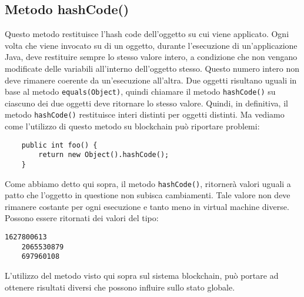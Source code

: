 		\subsection{Metodo hashCode()}
		\label{object-hashcode}
			Questo metodo restituisce l'hash code dell'oggetto su cui viene applicato. Ogni volta che viene invocato su di un oggetto, durante l'esecuzione di un'applicazione Java, deve restituire sempre lo stesso valore intero, a condizione che non vengano modificate delle variabili all'interno dell'oggetto stesso. Questo numero intero non deve rimanere coerente da un'esecuzione all'altra. Due oggetti risultano uguali in base al metodo \lstinline|equals(Object)|, quindi chiamare il metodo \lstinline|hashCode()| su ciascuno dei due oggetti deve ritornare lo stesso valore. Quindi, in definitiva, il metodo \lstinline|hashCode()| restituisce interi distinti per oggetti distinti. Ma vediamo come l'utilizzo di questo metodo su blockchain può riportare problemi:
			\begin{lstlisting}
	public int foo() {
		return new Object().hashCode();
	}
			\end{lstlisting}
			Come abbiamo detto qui sopra, il metodo \lstinline|hashCode()|, ritornerà valori uguali a patto che l'oggetto in questione non subisca cambiamenti. Tale valore non deve rimanere costante per ogni esecuzione e tanto meno in virtual machine diverse. Possono essere ritornati dei valori del tipo:
			\begin{lstlisting}[numbers=none,frame=none]
	1627800613
	2065530879
	697960108
			\end{lstlisting}
			L'utilizzo del metodo visto qui sopra sul sistema blockchain, può portare ad ottenere risultati diversi che possono influire sullo stato globale.
			
